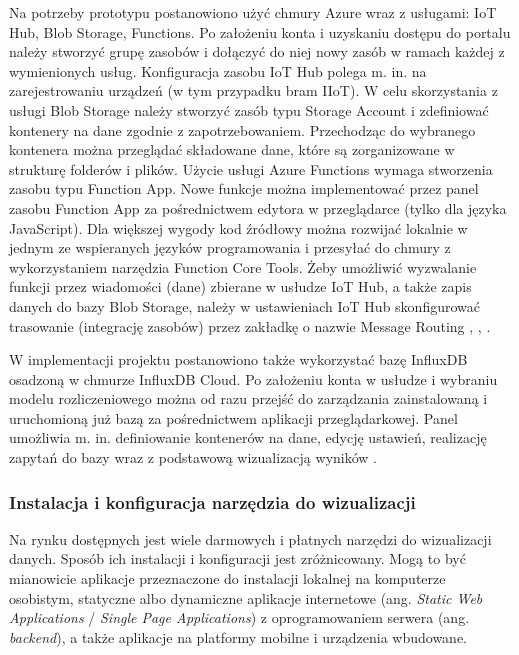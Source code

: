\documentclass[a4paper, 12pt, twoside]{article}
\begin{document}
Na potrzeby prototypu postanowiono użyć chmury Azure wraz z usługami:
IoT Hub, Blob Storage, Functions. Po założeniu konta i uzyskaniu
dostępu do portalu należy stworzyć grupę zasobów i dołączyć do niej nowy zasób
w ramach każdej z wymienionych usług.
Konfiguracja zasobu IoT Hub polega m. in. na zarejestrowaniu urządzeń (w tym przypadku bram IIoT).
W celu skorzystania z usługi Blob Storage należy stworzyć zasób typu
Storage Account i zdefiniować kontenery na dane zgodnie z zapotrzebowaniem.
Przechodząc do wybranego kontenera można przeglądać składowane dane, które
są zorganizowane w strukturę folderów i plików.
Użycie usługi Azure Functions wymaga stworzenia zasobu typu Function App.
Nowe funkcje można implementować przez panel zasobu Function App za pośrednictwem
edytora w przeglądarce (tylko dla języka JavaScript). Dla większej wygody
kod źródłowy można rozwijać lokalnie w jednym ze wspieranych języków programowania
i przesyłać do chmury z wykorzystaniem narzędzia Function Core Tools.
Żeby umożliwić wyzwalanie funkcji przez wiadomości (dane) zbierane w usłudze IoT Hub,
a także zapis danych do bazy Blob Storage, należy w ustawieniach IoT Hub
skonfigurować trasowanie (integrację zasobów) przez zakładkę o nazwie Message Routing
\cite{iot-hub-doc}, \cite{blob-storage-doc}, \cite{functions-doc}.

W implementacji projektu postanowiono także wykorzystać bazę InfluxDB
osadzoną w chmurze InfluxDB Cloud. Po założeniu konta w usłudze i wybraniu
modelu rozliczeniowego można od razu przejść do zarządzania zainstalowaną
i uruchomioną już bazą za pośrednictwem aplikacji przeglądarkowej. Panel
umożliwia m. in. definiowanie kontenerów na dane, edycję ustawień,
realizację zapytań do bazy wraz z podstawową wizualizacją wyników \cite{influx-db}.


\subsubsection{Instalacja i konfiguracja narzędzia do wizualizacji}\label{grafana-conf}

Na rynku dostępnych jest wiele darmowych i płatnych narzędzi do wizualizacji danych.
Sposób ich instalacji i konfiguracji jest zróżnicowany. Mogą to być mianowicie
aplikacje przeznaczone do instalacji lokalnej na komputerze osobistym,
statyczne albo dynamiczne aplikacje internetowe (ang. \emph{Static Web Applications} / \emph{Single Page Applications})
z oprogramowaniem serwera (ang. \emph{backend}), a także
aplikacje na platformy mobilne i urządzenia wbudowane.
\end{document}
